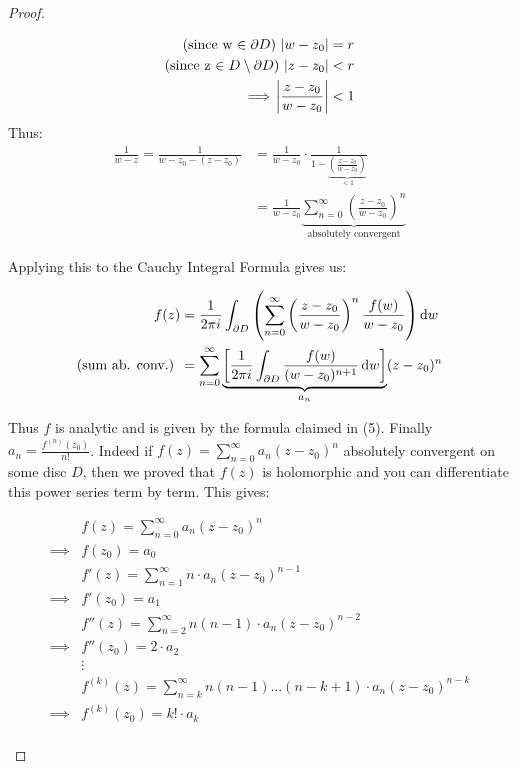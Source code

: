 \begin{proof}
\begin{enumerate}
\begin{align*}
    \text{(since w $\in \partial D$)  } \abs{w-z_0} &= r\\
    \text{(since z $\in D \setminus \partial D$)  } \abs{z-z_0} &< r\\
    \implies \abs{\frac{z-z_0}{w-z_0}} &< 1
\end{align*}
Thus:
\begin{align*} 
    \frac{1}{w-z} = \frac{1}{w-z_0-(z-z_0)} &= \frac{1}{w-z_0} \cdot \frac{1}{1-   \underbrace{ \left( \frac{z-z_0}{w-z_0} \right)   }_{<1}}\\
    &= \frac{1}{w-z_0} \underbrace{ \sum_{n=0}^\infty \left( \frac{z-z_0}{w-z_0} \right)^n }_{\text{absolutely convergent}}
\end{align*}
    
Applying this to the Cauchy Integral Formula gives us:

\begin{align*}
     f(z) &= \frac{1}{2\pi i} \int_{\partial D} \left( \sum_{n=0}^\infty \left( \frac{z-z_0}{w-z_0} \right)^n \frac{f(w)}{w-z_0} \right) \dif w\\
     \text{(sum ab. conv.) } &= \sum_{n=0}^\infty \underbrace{ \left[  \frac{1}{2\pi i} \int_{\partial D}  \frac{f(w)}{(w-z_0)^{n+1}} \dif w  \right] }_{a_n} (z-z_0)^n \\
\end{align*}
    
Thus $f$ is analytic and is given by the formula claimed in (5). Finally $a_n = \frac{f^{(n)} (z_0)}{n!}$. Indeed if $f(z) = \sum_{n=0}^\infty a_n (z-z_0)^n$ absolutely convergent on some disc $D$, then we proved that $f(z)$ is holomorphic and you can differentiate this power series term by term. This gives:

\begin{align*}
    &f(z) = \sum_{n=0}^\infty a_n (z-z_0)^n\\
    \implies &f(z_0) = a_0\\
    &f'(z) = \sum_{n=1}^\infty n \cdot a_n (z-z_0)^{n-1}\\
    \implies &f'(z_0) = a_1\\
    &f''(z) = \sum_{n=2}^\infty n(n-1) \cdot a_n (z-z_0)^{n-2}\\
    \implies &f''(z_0) = 2\cdot a_2\\
    &\vdots \\
    &f^{(k)}(z) = \sum_{n=k}^\infty n(n-1)\hdots(n-k+1) \cdot a_n (z-z_0)^{n-k}\\
    \implies &f^{(k)}(z_0) = k! \cdot a_k\\
\end{align*}


\end{enumerate}
\end{proof}
